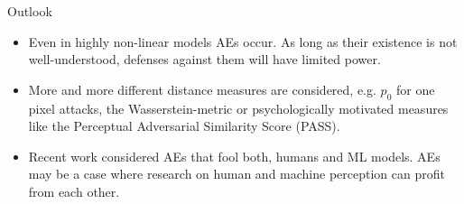 \documentclass[11pt,compress,t,notes=noshow, xcolor=table]{beamer}
\begin{document}
\begin{vbframe}{Outlook}
\begin{itemize}
    \item Even in highly non-linear models AEs occur. As long as their existence is not well-understood, defenses against them will have limited power.
    \item More and more different distance measures are considered, e.g. $p_0$ for one pixel attacks, the Wasserstein-metric or psychologically motivated measures like the Perceptual Adversarial Similarity Score (PASS).
    \item Recent work considered AEs that fool both, humans and ML models. AEs may be a case where research on human and machine perception can profit from each other.
\end{itemize}
\end{vbframe}




\endlecture
\end{document}
